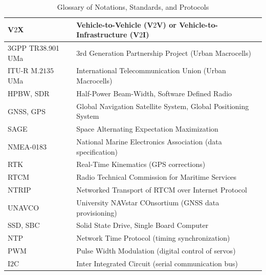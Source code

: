 \documentclass[10pt, twocolumn]{IEEEtran}
\begin{document}
\begin{table} [tb]
	\centering
	\scriptsize
	\begin{tabular}{|l||l|}
		\hline
		V$2$X & Vehicle-to-Vehicle (V$2$V) or Vehicle-to-Infrastructure (V$2$I)\\
		\hline
		$3$GPP TR38.901 UMa & $3$rd Generation Partnership Project (Urban Macrocells)\\
		\hline
		ITU-R M$.2135$ UMa & International Telecommunication Union (Urban Macrocells)\\
		\hline
		HPBW, SDR & Half-Power Beam-Width, Software Defined Radio\\
		\hline
		GNSS, GPS & Global Navigation Satellite System, Global Positioning System\\
		\hline
		SAGE & Space Alternating Expectation Maximization\\
		\hline
		NMEA-0183 & National Marine Electronics Association (data specification)\\
		\hline
		RTK & Real-Time Kinematics (GPS corrections)\\
		\hline
		RTCM & Radio Technical Commission for Maritime Services\\
		\hline
		NTRIP & Networked Transport of RTCM over Internet Protocol\\
		\hline
		UNAVCO & University NAVstar COnsortium (GNSS data provisioning)\\
		\hline
		SSD, SBC & Solid State Drive, Single Board Computer\\
		\hline
		NTP & Network Time Protocol (timing synchronization)\\
		\hline
		PWM & Pulse Width Modulation (digital control of servos)\\
		\hline
		I$2$C & Inter Integrated Circuit (serial communication bus)\\
		\hline
	\end{tabular}
	\vspace{-0.25mm}
	\caption{Glossary of Notations, Standards, and Protocols}
	\label{T1}
\end{table}
\end{document}
